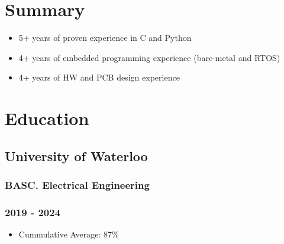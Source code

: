 \documentclass[lighthipster]{styles}
\renewcommand{\normalsize}{\fontsize{10.25}{1}\selectfont}
\begin{document}
\setlength{\columnsep}{1cm}
\begin{paracol}{2}






{
\flushleft

\setlength\columnsep{0.4cm} %

\section*{Summary}
\vspace{0.1cm}

\begin{itemize}
    \item 5+ years of proven experience in C and Python
    \item 4+ years of embedded programming experience (bare-metal and RTOS)
    \item 4+ years of HW and PCB design experience
\end{itemize}

\vspace{0.05cm}

\section*{Education}
\subsection*{University of Waterloo}
\subsubsection*{BASC. Electrical Engineering} \vspace{-0.075cm}
\subsubsection*{\color{ryanGrey}2019 - 2024}
\begin{itemize}
    \item Cummulative Average: 87\%
\end{itemize}

}
\end{paracol}
\end{document}

